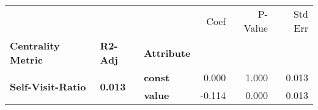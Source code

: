 \begin{tabular}{lllrrr}
\toprule
                 &       &       &   Coef &  P-Value &  Std Err \\
\textbf{Centrality Metric} & \textbf{R2-Adj} & \textbf{Attribute} &        &          &          \\
\midrule
\multirow{2}{*}{\textbf{Self-Visit-Ratio}} & \multirow{2}{*}{\textbf{0.013}} & \textbf{const} &  0.000 &    1.000 &    0.013 \\
                 &       & \textbf{value} & -0.114 &    0.000 &    0.013 \\
\bottomrule
\end{tabular}
